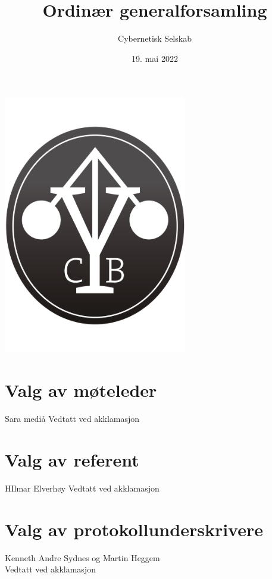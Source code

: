 \documentclass[10pt,norsk,a4paper,usenames,dvipsnames]{article}
\title{\huge Ordinær generalforsamling}
\author{\LARGE Cybernetisk Selskab}
\date{19. mai 2022}
\begin{document}
\maketitle



\begin{center}


\includegraphics[width=0.6\textwidth,height=0.6\textheight,keepaspectratio=true]{cyblogoa3.pdf}

\end{center}


\newpage


\tableofcontents

\section{Valg av møteleder}
Sara mediå Vedtatt ved akklamasjon

\section{Valg av referent}
HIlmar Elverhøy Vedtatt ved akklamasjon

\section{Valg av protokollunderskrivere}
Kenneth Andre Sydnes og
Martin Heggem\\
Vedtatt ved akklamasjon
\end{document}
